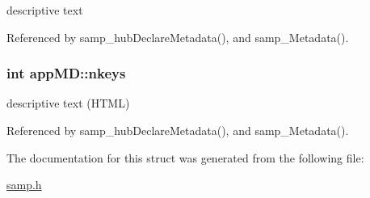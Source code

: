 descriptive text 

Referenced by samp\_\-hubDeclareMetadata(), and samp\_\-Metadata().\hypertarget{structappMD_4b9f5ebb7d20beb53a7bfe192009e89a}{
\subsubsection[{nkeys}]{\setlength{\rightskip}{0pt plus 5cm}int {\bf appMD::nkeys}}}
\label{structappMD_4b9f5ebb7d20beb53a7bfe192009e89a}


descriptive text (HTML) 

Referenced by samp\_\-hubDeclareMetadata(), and samp\_\-Metadata().

The documentation for this struct was generated from the following file:\begin{CompactItemize}
\item 
\hyperlink{samp_8h}{samp.h}\end{CompactItemize}
